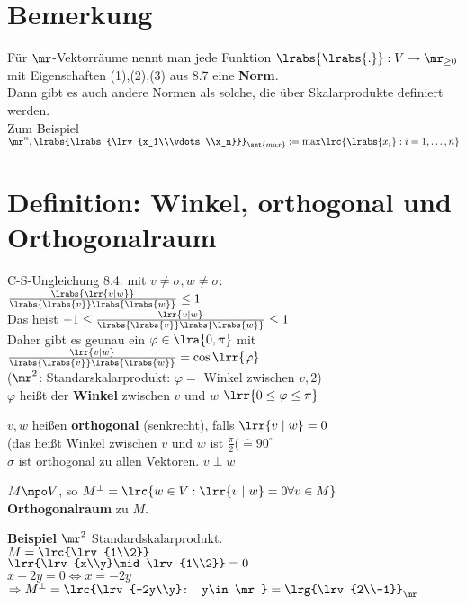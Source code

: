 \section{Bemerkung}
	Für $\mr$-Vektorräume nennt man jede Funktion $\lrabs{\lrabs{.}}:V\rightarrow\mr_{\geq 0}$ mit Eigenschaften (1),(2),(3) aus 8.7 eine \textbf{Norm}.\\
	Dann gibt es auch andere Normen als solche, die über Skalarprodukte definiert werden.\\
	Zum Beispiel $\mr^n, \lrabs{\lrabs{\lrv{x_1\\\vdots\\x_n}}}_{\smt{max}}:=\mbox{max}\lrc{\lrabs{x_i}:i=1,\dots,n}$

\section{Definition: Winkel, orthogonal und Orthogonalraum}
		\item C-S-Ungleichung 8.4. mit $v\neq\sigma, w\neq\sigma$:\\
			$\frac{\lrabs{\lrr{v\mid w}}}{\lrabs{\lrabs{v}}\lrabs{\lrabs{w}}}\leq 1$\\
			Das heist $-1\leq\frac{\lrr{v\mid w}}{\lrabs{\lrabs{v}}\lrabs{\lrabs{w}}}\leq 1$\\
			Daher gibt es geunau ein $\varphi\in\lra{0,\pi}$ mit $\frac{\lrr{v\mid w}}{\lrabs{\lrabs{v}}\lrabs{\lrabs{w}}}=\cos\lrr{\varphi}$\\
			($\mr^2$: Standarskalarprodukt: $\varphi=$ Winkel zwischen $v,2$)\\
			$\varphi$ heißt der \textbf{Winkel} zwischen $v$ und $w$ $\lrr{0\leq\varphi\leq\pi}$
		\item $v,w$ heißen \textbf{orthogonal} (senkrecht), falls $\lrr{v\mid w}=0$\\
			(das heißt Winkel zwischen $v$ und $w$ ist $\frac{\pi}{2}(\hat{=}90^\circ$\\
			$\sigma$ ist orthogonal zu allen Vektoren. $v \perp w$
		\item $M\mpo V$, so $M^\perp=\lrc{w\in V:\lrr{v\mid w}=0\forall v\in M}$\\
			\textbf{Orthogonalraum} zu $M$.

			\textbf{Beispiel} $\mr^2$ Standardskalarprodukt.\\
				$M=\lrc{\lrv{1\\2}}$\\
				$\lrr{\lrv{x\\y}\mid\lrv{1\\2}}=0$\\
				$x+2y=0\Leftrightarrow x=-2y$\\
				$\Rightarrow M^\perp=\lrc{\lrv{-2y\\y}: y\in\mr}=\lrg{\lrv{2\\-1}}_\mr$
	\subExEnd

